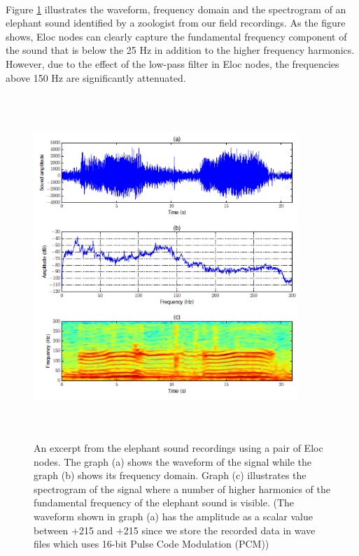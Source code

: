\documentclass[12pt]{article}
\numberwithin{figure}{section}
\numberwithin{table}{section}
\begin{document}
\paragraph{}
Figure \ref{waveform:specto} illustrates the waveform, frequency domain and the spectrogram of an elephant sound identified by
a zoologist from our field recordings. As the figure shows, Eloc nodes can clearly capture the fundamental frequency
component of the sound that is below the 25 Hz in addition to the higher frequency harmonics. However, due to the effect
of the low-pass filter in Eloc nodes, the frequencies above 150 Hz are significantly attenuated.

\begin{figure}[H]
\centering
\includegraphics[width=10cm,height=13cm,keepaspectratio]{wild_recordings.png}
\caption[Waveform and spectrogram of a recording]{An excerpt from the elephant sound recordings using
a pair of Eloc nodes. The graph (a) shows the waveform
of the signal while the graph (b) shows its frequency domain.
Graph (c) illustrates the spectrogram of the signal where a
number of higher harmonics of the fundamental frequency of
the elephant sound is visible. (The waveform shown in graph
(a) has the amplitude as a scalar value between +215 and
+215 since we store the recorded data in wave files which
uses 16-bit Pulse Code Modulation (PCM))}
\label{waveform:specto}
\end{figure}
\end{document}
